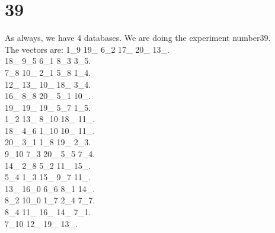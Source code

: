 \chapter{39}
\indent As always, we have 4 databases. We are doing the experiment number39.\\
The vectors are:
1\_9 19\_ 6\_2 17\_ 20\_ 13\_.\\18\_ 9\_5 6\_1 8\_3 3\_5.\\7\_8 10\_ 2\_1 5\_8 1\_4.\\12\_ 13\_ 10\_ 18\_ 3\_4.\\16\_ 8\_8 20\_ 5\_1 10\_.\\19\_ 19\_ 19\_ 5\_7 1\_5.\\1\_2 13\_ 8\_10 18\_ 11\_.\\18\_ 4\_6 1\_10 10\_ 11\_.\\20\_ 3\_1 1\_8 19\_ 2\_3.\\9\_10 7\_3 20\_ 5\_5 7\_4.\\14\_ 2\_8 5\_2 11\_ 15\_.\\5\_4 1\_3 15\_ 9\_7 11\_.\\13\_ 16\_0 6\_6 8\_1 14\_.\\8\_2 10\_0 1\_7 2\_4 7\_7.\\8\_4 11\_ 16\_ 14\_ 7\_1.\\7\_10 12\_ 19\_ 13\_.\\